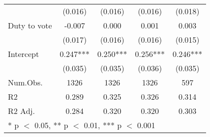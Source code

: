 \begin{table}
\begin{tabular}[t]{lcccc}
 & (0.016) & (0.016) & (0.016) & (0.018)\\
Duty to vote & -0.007 & 0.000 & 0.001 & 0.003\\
 & (0.017) & (0.016) & (0.016) & (0.015)\\
Intercept & 0.247*** & 0.250*** & 0.256*** & 0.246***\\
 & (0.035) & (0.035) & (0.036) & (0.035)\\
\midrule
Num.Obs. & 1326 & 1326 & 1326 & 597\\
R2 & 0.289 & 0.325 & 0.326 & 0.314\\
R2 Adj. & 0.284 & 0.320 & 0.320 & 0.303\\
\bottomrule
\multicolumn{5}{l}{\rule{0pt}{1em}* p $<$ 0.05, ** p $<$ 0.01, *** p $<$ 0.001}\\
\end{tabular}
\end{table}
